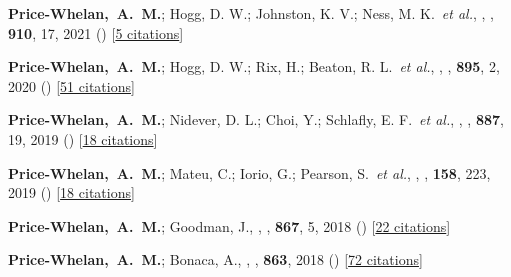 \item[{\color{deemph}\scriptsize18}]\textbf{Price-Whelan,~A.~M.}; Hogg, D. W.; Johnston, K. V.; Ness, M. K.~\textit{et al.}, , \apj, \textbf{910}, 17, 2021 () [\href{http://adsabs.harvard.edu/abs/2021ApJ...910...17P}{5 citations}]

\item[{\color{deemph}\scriptsize17}]\textbf{Price-Whelan,~A.~M.}; Hogg, D. W.; Rix, H.; Beaton, R. L.~\textit{et al.}, , \apj, \textbf{895}, 2, 2020 () [\href{http://adsabs.harvard.edu/abs/2020ApJ...895....2P}{51 citations}]

\item[{\color{deemph}\scriptsize16}]\textbf{Price-Whelan,~A.~M.}; Nidever, D. L.; Choi, Y.; Schlafly, E. F.~\textit{et al.}, , \apj, \textbf{887}, 19, 2019 () [\href{http://adsabs.harvard.edu/abs/2019ApJ...887...19P}{18 citations}]

\item[{\color{deemph}\scriptsize15}]\textbf{Price-Whelan,~A.~M.}; Mateu, C.; Iorio, G.; Pearson, S.~\textit{et al.}, , \aj, \textbf{158}, 223, 2019 () [\href{http://adsabs.harvard.edu/abs/2019AJ....158..223P}{18 citations}]

\item[{\color{deemph}\scriptsize14}]\textbf{Price-Whelan,~A.~M.}; Goodman, J., , \apj, \textbf{867}, 5, 2018 () [\href{http://adsabs.harvard.edu/abs/2018ApJ...867....5P}{22 citations}]

\item[{\color{deemph}\scriptsize13}]\textbf{Price-Whelan,~A.~M.}; Bonaca, A., , \apj, \textbf{863}, 2018 () [\href{http://adsabs.harvard.edu/abs/2018ApJ...863L..20P}{72 citations}]

